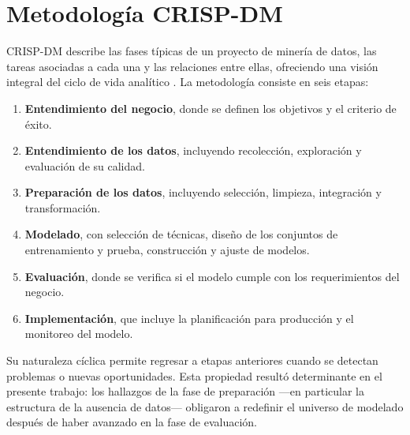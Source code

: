 \section{Metodología CRISP-DM}

CRISP-DM describe las fases típicas de un proyecto de minería de datos, las tareas
asociadas a cada una y las relaciones entre ellas, ofreciendo una visión integral
del ciclo de vida analítico \cite{chapman2000crispdm, hotz2018crispdm}. La
metodología consiste en seis etapas:

\begin{enumerate}
    \item \textbf{Entendimiento del negocio}, donde se definen los objetivos y el
    criterio de éxito.
    \item \textbf{Entendimiento de los datos}, incluyendo recolección, exploración y
    evaluación de su calidad.
    \item \textbf{Preparación de los datos}, incluyendo selección, limpieza,
    integración y transformación.
    \item \textbf{Modelado}, con selección de técnicas, diseño de los conjuntos de
    entrenamiento y prueba, construcción y ajuste de modelos.
    \item \textbf{Evaluación}, donde se verifica si el modelo cumple con los
    requerimientos del negocio.
    \item \textbf{Implementación}, que incluye la planificación para producción y el
    monitoreo del modelo.
\end{enumerate}

Su naturaleza cíclica permite regresar a etapas anteriores cuando se detectan
problemas o nuevas oportunidades. Esta propiedad resultó determinante en el
presente trabajo: los hallazgos de la fase de preparación —en particular la
estructura de la ausencia de datos— obligaron a redefinir el universo de modelado
después de haber avanzado en la fase de evaluación.
